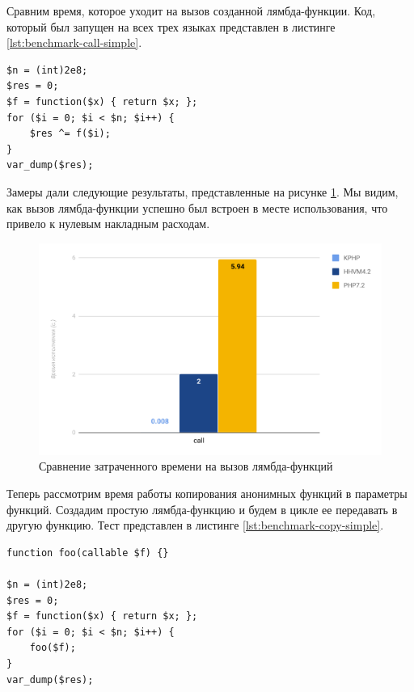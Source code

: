 Сравним время, которое уходит на вызов созданной лямбда-функции.
Код, который был запущен на всех трех языках представлен в листинге \ref{lst:benchmark-call-simple}.
\begin{lstlisting}[caption={Бенчмарк вызовов анонимных функций},label={lst:benchmark-call-simple}]
$n = (int)2e8;
$res = 0;
$f = function($x) { return $x; };
for ($i = 0; $i < $n; $i++) {
    $res ^= f($i);
}
var_dump($res);
\end{lstlisting}

Замеры дали следующие результаты, представленные на рисунке \ref{fig:benchmark-call-simple}.
Мы видим, как вызов лямбда-функции успешно был встроен в месте использования, что привело к нулевым накладным расходам.
\begin{figure}[H]
    \caption{Сравнение затраченного времени на вызов лямбда-функций}
    \label{fig:benchmark-call-simple}
    \centering
    \includegraphics[width=\linewidth]{images/benchmark_call_simple}
\end{figure}

Теперь рассмотрим время работы копирования анонимных функций в параметры функций.
Создадим простую лямбда-функцию и будем в цикле ее передавать в другую функцию.
Тест представлен в листинге \ref{lst:benchmark-copy-simple}.
\begin{lstlisting}[caption={Бенчмарк копирования анонимных функций},label={lst:benchmark-copy-simple}]
function foo(callable $f) {}

$n = (int)2e8;
$res = 0;
$f = function($x) { return $x; };
for ($i = 0; $i < $n; $i++) {
    foo($f);
}
var_dump($res);
\end{lstlisting}

